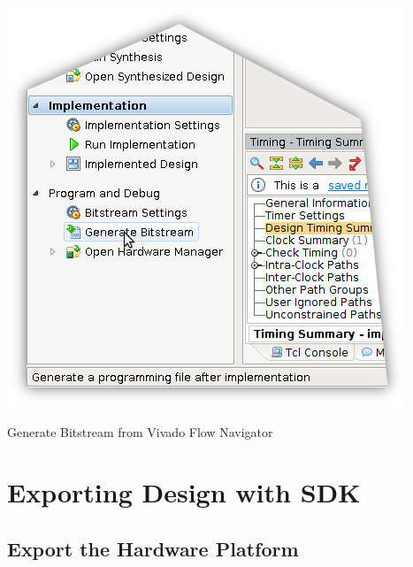 \begin{marginfigure}
	\centering
	\includegraphics{images/Generate_Bitstream.png}
	\caption[Generate Bitstream from Vivado Flow Navigator]{Generate Bitstream from Vivado Flow Navigator}
	\label{fig:genbitstream}
\end{marginfigure}





\section{Exporting Design with SDK}

\subsection{Export the Hardware Platform}

